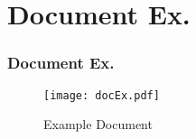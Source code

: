 \section{Document Ex.}

\begin{frame}[allowframebreaks=0.8,fragile]
\frametitle{Document Ex.}

\framebreak
\begin{figure}[DocEx] 
  \begin{centering}
  \texttt{[image: docEx.pdf]}
  \caption{Example Document}
  \end{centering}
\end{figure}
\end{frame}
